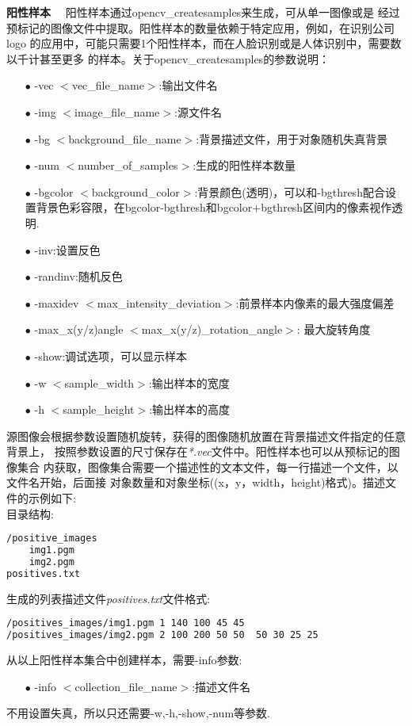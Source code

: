 \textbf{阳性样本}~~
阳性样本通过\textsf{opencv\_createsamples}来生成，可从单一图像或是
经过预标记的图像文件中提取。阳性样本的数量依赖于特定应用，例如，在识别公司logo
的应用中，可能只需要1个阳性样本，而在人脸识别或是人体识别中，需要数以千计甚至更多
的样本。关于\textsf{opencv\_createsamples}的参数说明：
\begin{enumerate}
\item[$\bullet$]\textsf{-vec $<$vec\_file\_name$>$}:输出文件名
\item[$\bullet$]\textsf{-img $<$image\_file\_name$>$}:源文件名
\item[$\bullet$]\textsf{-bg $<$background\_file\_name$>$}:背景描述文件，用于对象随机失真背景
\item[$\bullet$]\textsf{-num $<$number\_of\_samples$>$}:生成的阳性样本数量
\item[$\bullet$]\textsf{-bgcolor $<$background\_color$>$}:背景颜色(透明)，可以和\textsf{-bgthresh}配合设置背景色彩容限，在\textsf{bgcolor-bgthresh}和\textsf{bgcolor+bgthresh}区间内的像素视作透明.
\item[$\bullet$]\textsf{-inv}:设置反色
\item[$\bullet$]\textsf{-randinv}:随机反色
\item[$\bullet$]\textsf{-maxidev $<$max\_intensity\_deviation$>$}:前景样本内像素的最大强度偏差
\item[$\bullet$]\textsf{-max\_x(y/z)angle $<$max\_x(y/z)\_rotation\_angle$>$}:
最大旋转角度
\item[$\bullet$]\textsf{-show}:调试选项，可以显示样本
\item[$\bullet$]\textsf{-w $<$sample\_width$>$}:输出样本的宽度
\item[$\bullet$]\textsf{-h $<$sample\_height$>$}:输出样本的高度
\end{enumerate}
源图像会根据参数设置随机旋转，获得的图像随机放置在背景描述文件指定的任意背景上，
按照参数设置的尺寸保存在\textit{*.vec}文件中。阳性样本也可以从预标记的图像集合
内获取，图像集合需要一个描述性的文本文件，每一行描述一个文件，以文件名开始，后面接
对象数量和对象坐标((x，y，width，height)格式)。描述文件的示例如下:\\
目录结构:
\begin{lstlisting}[language=bash]
/positive_images
	img1.pgm
	img2.pgm
positives.txt
\end{lstlisting}

生成的列表描述文件\textit{positives.txt}文件格式:
\begin{lstlisting}[language=bash]
/positives_images/img1.pgm 1 140 100 45 45
/positives_images/img2.pgm 2 100 200 50 50  50 30 25 25
\end{lstlisting}
从以上阳性样本集合中创建样本，需要\textsf{-info}参数:
\begin{enumerate}
\item[$\bullet$]\textsf{-info $<$collection\_file\_name$>$}:描述文件名
\end{enumerate}
不用设置失真，所以只还需要\textsf{-w,-h,-show,-num}等参数.

